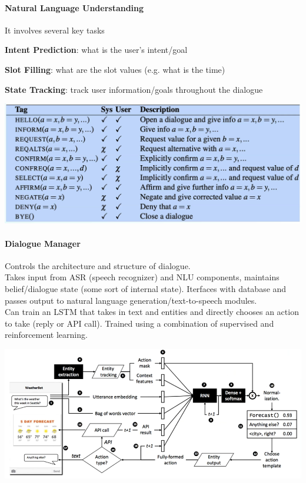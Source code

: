 \documentclass[10pt]{report}
\begin{document}
\paragraph{Natural Language Understanding} It involves several key tasks
\begin{list}{}{}
	\item \textbf{Intent Prediction}: what is the user's intent/goal
	\item \textbf{Slot Filling}: what are the slot values (e.g. what is the time)
	\item \textbf{State Tracking}: track user information/goals throughout the dialogue
\end{list}
\begin{center}
	\includegraphics[scale=0.5]{117.png}
\end{center}
\paragraph{Dialogue Manager} Controls the architecture and structure of dialogue.\\
Takes input from ASR (speech recognizer) and NLU components, maintains belief/dialogue state (some sort of internal state). Iterfaces with database and passes output to natural language generation/text-to-speech modules.\\
Can train an LSTM that takes in text and entities and directly chooses an action to take (reply or API call). Trained using a combination of supervised and reinforcement learning.
\begin{center}
	\includegraphics[scale=0.5]{118.png}
\end{center}
\end{document}
